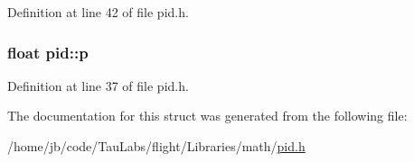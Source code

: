 \-Definition at line 42 of file pid.\-h.

\hypertarget{structpid_a8281b69c68be641d7b0dcf0322b3715f}{
\subsubsection[{p}]{\setlength{\rightskip}{0pt plus 5cm}float {\bf pid\-::p}}}\label{structpid_a8281b69c68be641d7b0dcf0322b3715f}


\-Definition at line 37 of file pid.\-h.



\-The documentation for this struct was generated from the following file\-:\begin{DoxyCompactItemize}
\item 
/home/jb/code/\-Tau\-Labs/flight/\-Libraries/math/\hyperlink{pid_8h}{pid.\-h}\end{DoxyCompactItemize}
